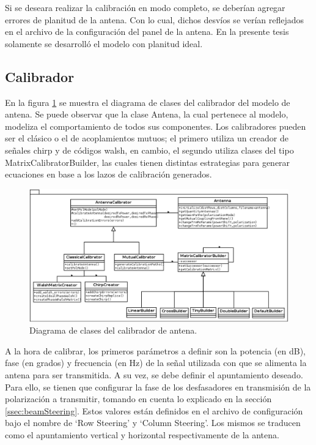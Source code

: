 Si se deseara realizar la calibración en modo completo, se deberían agregar errores de planitud de la antena. Con lo cual, 
dichos desvíos se verían reflejados en el archivo de la configuración del panel de la antena. En la presente tesis solamente 
se desarrolló el modelo con planitud ideal.

\subsection{Calibrador}

En la figura \ref{fig:modelPackage} se muestra el diagrama de clases del calibrador del modelo de antena. Se puede observar que
la clase Antena, la cual pertenece al modelo, modeliza el comportamiento de todos sus componentes. Los calibradores pueden ser 
el clásico o el de acoplamientos mutuos; el primero utiliza un creador de señales chirp y de códigos walsh, en cambio, el 
segundo utiliza clases del tipo MatrixCalibratorBuilder, las cuales tienen distintas estrategias para generar ecuaciones en base
a los lazos de calibración generados.

\begin{figure}
 \centering
 \includegraphics[width=15cm]{gfx/modelPackage.png}
 \caption{Diagrama de clases del calibrador de antena.}
 \label{fig:modelPackage}
\end{figure}


A la hora de calibrar, los primeros parámetros a definir son la potencia (en dB), fase (en grados) y frecuencia (en Hz) de la 
señal utilizada con que se alimenta la antena para ser transmitida. A su vez, se debe definir el apuntamiento deseado. Para 
ello, se tienen que configurar la fase de los desfasadores en transmisión de la polarización a transmitir, tomando en cuenta lo 
explicado en la sección \ref{ssec:beamSteering}. Estos valores están definidos en el archivo de configuración bajo el nombre 
de \enquote*{Row Steering} y \enquote*{Column Steering}. Los mismos se traducen como el apuntamiento vertical y horizontal 
respectivamente de la antena.

